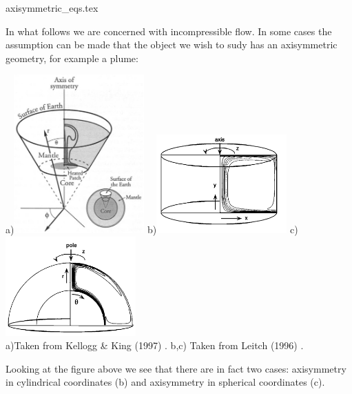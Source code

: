 \begin{flushright} {\tiny {\color{gray} axisymmetric\_eqs.tex}} \end{flushright}

In what follows we are concerned with incompressible flow.
In some cases the assumption can be made that the object we wish to sudy has an 
axisymmetric geometry, for example a plume:

\begin{center}
a)\includegraphics[width=5cm]{images/axisymmetry/keki97}
b)\includegraphics[width=5cm]{images/axisymmetry/lesy96a}
c)\includegraphics[width=5cm]{images/axisymmetry/lesy96b}\\
{\captionfont a)Taken from Kellogg \& King (1997) \cite{keki97}.
b,c) Taken from Leitch \etal (1996) \cite{lesy96}.}
\end{center}

Looking at the figure above we see that there are in fact two cases: axisymmetry in 
cylindrical coordinates (b) and axisymmetry in spherical coordinates (c).

